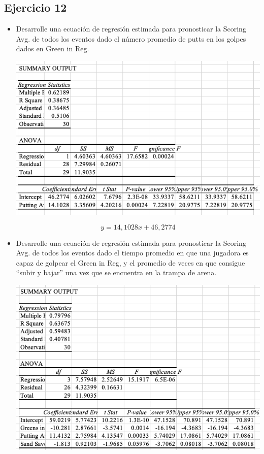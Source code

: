 \documentclass[a4paper,12pt]{article}
\begin{document}
\subsection{Ejercicio 12}

\begin{itemize}
    \item Desarrolle una ecuación de regresión estimada para pronosticar la Scoring Avg. de todos los eventos dado el número promedio de putts en los golpes dados en Green in Reg.
    \begin{center}
        \includegraphics[scale=0.5]{Imagenes/60-10.png}
    \end{center}
    $$y=14,1028x+46,2774$$
    \item Desarrolle una ecuación de regresión estimada para pronosticar la Scoring Avg. de todos los eventos dado el tiempo promedio en que una jugadora es capaz de golpear el Green in Reg, y el promedio de veces en que consigue “subir y bajar” una vez que se encuentra en la trampa de arena.
    \begin{center}
        \includegraphics[scale=0.5]{Imagenes/60-10-2.png}

\end{center}
\end{itemize}
\end{document}
